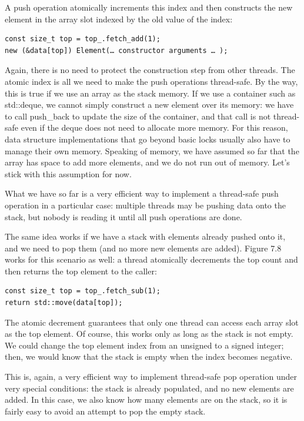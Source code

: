 A push operation atomically increments this index and then constructs the new element in the array slot indexed by the old value of the index:

\begin{lstlisting}[style=styleCXX]
const size_t top = top_.fetch_add(1);
new (&data[top]) Element(… constructor arguments … );
\end{lstlisting}

Again, there is no need to protect the construction step from other threads. The atomic index is all we need to make the push operations thread-safe. By the way, this is true if we use an array as the stack memory. If we use a container such as std::deque, we cannot simply construct a new element over its memory: we have to call push\_back to update the size of the container, and that call is not thread-safe even if the deque does not need to allocate more memory. For this reason, data structure implementations that go beyond basic locks usually also have to manage their own memory. Speaking of memory, we have assumed so far that the array has space to add more elements, and we do not run out of memory. Let's stick with this assumption for now.

What we have so far is a very efficient way to implement a thread-safe push operation in a particular case: multiple threads may be pushing data onto the stack, but nobody is reading it until all push operations are done.

The same idea works if we have a stack with elements already pushed onto it, and we need to pop them (and no more new elements are added). Figure 7.8 works for this scenario as well: a thread atomically decrements the top count and then returns the top element to the caller:

\begin{lstlisting}[style=styleCXX]
const size_t top = top_.fetch_sub(1);
return std::move(data[top]);
\end{lstlisting}

The atomic decrement guarantees that only one thread can access each array slot as the top element. Of course, this works only as long as the stack is not empty. We could change the top element index from an unsigned to a signed integer; then, we would know that the stack is empty when the index becomes negative.

This is, again, a very efficient way to implement thread-safe pop operation under very special conditions: the stack is already populated, and no new elements are added. In this case, we also know how many elements are on the stack, so it is fairly easy to avoid an attempt to pop the empty stack.

